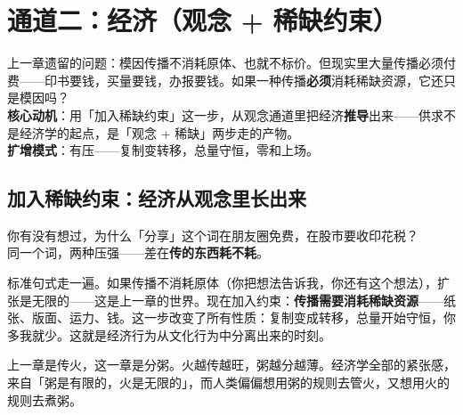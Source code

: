 \documentclass[../../main2.tex]{subfiles}
\begin{document}
\chapter{通道二：经济（观念 + 稀缺约束）}
\label{ch:economy}

\begin{motivation}
	上一章遗留的问题：模因传播不消耗原体、也就不标价。但现实里大量传播必须付费——印书要钱，买量要钱，办报要钱。如果一种传播\textbf{必须}消耗稀缺资源，它还只是模因吗？\\
	\textbf{核心动机}：用「加入稀缺约束」这一步，从观念通道里把经济\textbf{推导}出来——供求不是经济学的起点，是「观念 + 稀缺」两步走的产物。\\
	\textbf{扩增模式}：有压——复制变转移，总量守恒，零和上场。
\end{motivation}

\begin{logicmap}
\end{logicmap}

\section{加入稀缺约束：经济从观念里长出来}

\begin{readingnote}
	你有没有想过，为什么「分享」这个词在朋友圈免费，在股市要收印花税？\\
	同一个词，两种压强——差在\textbf{传的东西耗不耗}。
\end{readingnote}

标准句式走一遍。如果传播不消耗原体（你把想法告诉我，你还有这个想法），扩张是无限的——这是上一章的世界。现在加入约束：\textbf{传播需要消耗稀缺资源}——纸张、版面、运力、钱。这一步改变了所有性质：复制变成转移，总量开始守恒，你多我就少。这就是经济行为从文化行为中分离出来的时刻。

\begin{tcolorbox}[colback=green!5, title=\textit{生活类比}]
	上一章是传火，这一章是分粥。火越传越旺，粥越分越薄。经济学全部的紧张感，来自「粥是有限的，火是无限的」，而人类偏偏想用粥的规则去管火，又想用火的规则去煮粥。
\end{tcolorbox}
\end{document}
